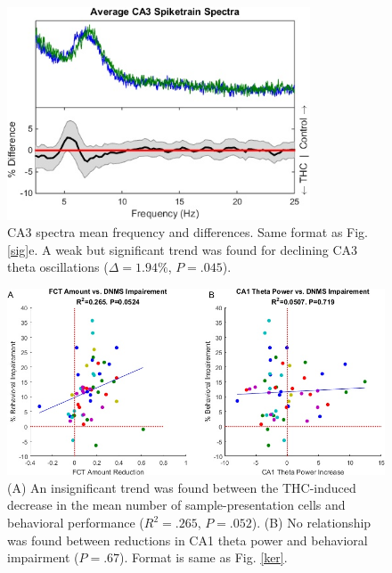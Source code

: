 \documentclass[11pt,a4paper,final]{article}
\begin{document}
\begin{figure}[!ht]
\centering
\includegraphics[width=90mm]{SFca3spectra}
\caption[CA3 Frequency Spectra]{
CA3 spectra mean frequency and differences. Same format as Fig. \ref{sig}e. A weak but significant trend was found for declining CA3 theta oscillations ($\Delta=1.94\%$, $P=.045$).}
\label{SFca3spectra}
\end{figure}

\begin{figure}[!ht]
\centering
\includegraphics[width=120mm]{SFnegsig}
\caption[Negative CA1 Theta Power Results]{
(A) An insignificant trend was found between the THC-induced decrease in the mean number of sample-presentation cells and behavioral performance ($R^2=.265$, $P=.052$).
(B) No relationship was found between reductions in CA1 theta power and behavioral impairment ($P=.67$).
Format is same as Fig. \ref{ker}.}
\label{SFnegsig}
\end{figure}
\end{document}
